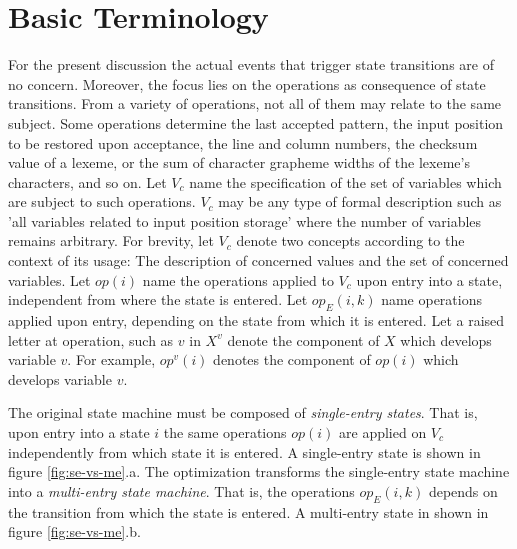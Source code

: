 \documentclass[12pt,a4paper]{scrartcl}
\begin{document}
%
\section{Basic Terminology}

For the present discussion the actual events that trigger state transitions are
of no concern. Moreover, the focus lies on the operations as consequence of
state transitions.  From a variety of operations, not all of them may relate to
the same subject.  Some operations determine the last accepted pattern, the
input position to be restored upon acceptance, the line and column numbers, the
checksum value of a lexeme, or the sum of character grapheme widths of the
lexeme's characters, and so on. Let $V_c$ name the specification of the set of
variables which are subject to such operations. $V_c$ may be any type of formal
description such as 'all variables related to input position storage' where the
number of variables remains arbitrary.  For brevity, let $V_c$ denote two
concepts according to the context of its usage: The description of concerned
values and the set of concerned variables. Let $op(i)$ name the operations
applied to $V_c$ upon entry into a state, independent from where the state is
entered. Let $op_E(i,k)$ name operations applied upon entry, depending on the
state from which it is  entered. Let a raised letter at operation, such as $v$
in $X^v$ denote the component of $X$ which develops variable $v$. For example,
$op^v(i)$ denotes the component of $op(i)$ which develops variable $v$. 

The original state machine must be composed of \textit{single-entry states}.
That is, upon entry into a state $i$ the same operations $op(i)$ are applied on
$V_c$ independently from which state it is entered.  A single-entry state is
shown in figure \ref{fig:se-vs-me}.a. The optimization transforms the
single-entry state machine into a \textit{multi-entry state machine}.  That is,
the operations $op_E(i,k)$ depends on the transition from which the state is
entered. A multi-entry state in shown in figure \ref{fig:se-vs-me}.b.
\end{document}

